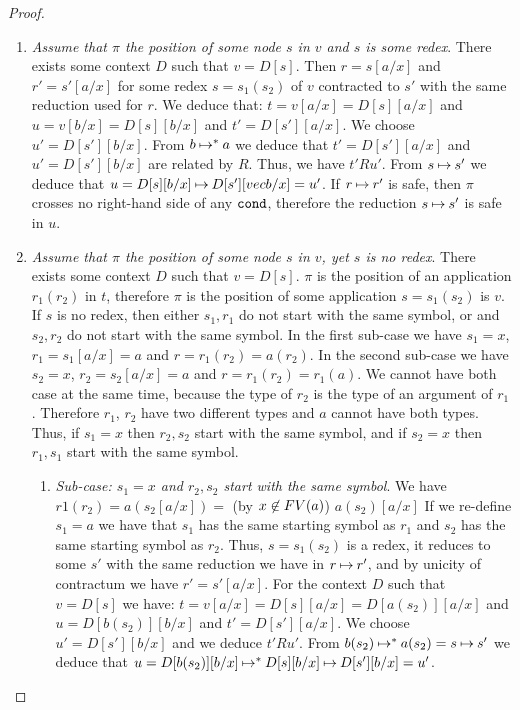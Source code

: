 \begin{proof}
\begin{enumerate}
\item
\emph{Assume that $\pi$ the position of some node $s$ in 
$v$ and \emph{$s$ is some redex}}.  
There exists some context $D$ such that $v = D[s]$. Then $r=s[a/x]$
and $r'=s'[a/x]$ for some redex $s=s_1(s_2)$ of $v$ contracted to $s'$
with the same reduction used for $r$.
We deduce that:
$ t  = v[a/x] = D[s][a/x]$ and 
$ u = v[b/x] = D[s][b/x]$ and
$ t' = D[s'][a/x]$. 
We choose $u' = D[s'][b/x]$. 
From $b \mathbin{\mapsto}^{*} a$ we deduce that
$t' = D[s'][a/x]$ and 
$u' = D[s'][b/x]$ are related by $R$.
Thus, we have $t' R u'$. From  $s \mathbin{\mapsto}   s'$ we deduce that 
$
u = D[s][b/x]
\mathbin{\mapsto}   
D[s'][vec{b}/x] = u'
$.
If $r \mathbin{\mapsto} r'$ is safe, then 
$\pi$ crosses no right-hand side of any ${\tt cond}$, therefore the reduction
$s \mathbin{\mapsto} s'$ is safe in $u$.


\item
\emph{Assume that $\pi$ the position of some node $s$ in 
$v$,  yet \emph{$s$ is no redex}}.  
There exists some context $D$ such that $v = D[s]$. 
$\pi$ is the position of an application $r_1(r_2)$ in $t$, therefore
$\pi$ is the position of some application $s = s_1(s_2)$ is $v$.
If $s$ is no redex, then either $s_1, r_1$ do not start with the same symbol,
or and $s_2, r_2$ do not start with the same symbol. In the first sub-case
we have $s_1=x$, $r_1 = s_1[a/x] = a$ and $r = r_1(r_2) = a(r_2)$.
In the second sub-case
we have $s_2=x$, $r_2 = s_2[a/x] = a$ and $r = r_1(r_2) = r_1(a)$.
We cannot have both case at the same time, 
because the type of $r_2$ is the type of an argument of $r_1$. 
Therefore $r_1$, $r_2$ have two different types and $a$ cannot have both types.
Thus, if $s_1=x$ then $r_2,s_2$ start with the same symbol, and if
$s_2=x$ then $r_1,s_1$ start with the same symbol.

\begin{enumerate}
\item
\emph{Sub-case: $s_1=x$ and $r_2,s_2$ start with the same symbol}. 
We have $r1(r_2) = a(s_2[a/x]) = $ (by $x \not \in {{\relax FV}}(a)$) $ a(s_2)[a/x]$ 
If we re-define $s_1=a$ we have that $s_1$ has the same starting symbol
as $r_1$ and $s_2$ has the same starting symbol as $r_2$.
Thus, $s = s_1(s_2)$ is a redex, it reduces to some $s'$ with the same reduction
we have in $r \mathbin{\mapsto} r'$, and by unicity of contractum we have $r' = s'[a/x]$.
For the context $D$ such that $v=D[s]$
we have: 
$ t  = v[a/x] = D[s][a/x] = D[a(s_2)][a/x]$ and 
$ u = D[b(s_2)][b/x] $ and
$ t' = D[s'][a/x]$. 
We choose $u' = D[s'][b/x]$ 
and we deduce $t' R u'$. 
From $b(s_2) \mathbin{\mapsto}^{*} a(s_2) = s \mathbin{\mapsto}   s'$
we deduce that $u = D[b(s_2)][b/x] \mathbin{\mapsto}^{*} 
D[s][b/x] \mathbin{\mapsto} D[s'][b/x] = u'$.


\end{enumerate}
\end{enumerate}
\end{proof}
